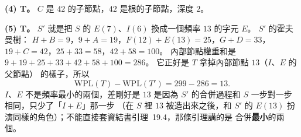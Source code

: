 \begin{pastsoln}
\textbf{(4) T。} $C$ 是 $42$ 的子節點，$42$ 是根的子節點，深度 $2$。

\textbf{(5) T。} $S'$ 就是把 $S$ 的 $E(7)$、$I(6)$ 換成一個頻率 $13$ 的字元 $E$。 $S'$ 的霍夫曼樹：
$H + B = 9$，$9 + A = 19$，$F(12) + E(13) = 25$，$G + D = 33$，$19 + C = 42$，$25 + 33 = 58$，$42 + 58 = 100$。
內部節點權重和是 $9 + 19 + 25 + 33 + 42 + 58 + 100 = 286$。 它正好是 $T$ 拿掉內部節點 $13$（$I$、$E$ 的父節點）
的樣子，所以
\[
\mathrm{WPL}(T) - \mathrm{WPL}(T') = 299 - 286 = 13.
\]
$I$、$E$ 不是頻率最小的兩個，差剛好是 $13$ 是因為 $S'$ 的合併過程和 $S$ 一步對一步相同，只少了「$I + E$」那一步
（在 $S$ 裡 $13$ 被造出來之後，和 $S'$ 的 $E(13)$ 扮演同樣的角色）；不能直接套資結書引理~19.4，那條引理講的是
合併\textbf{最小}的兩個。
\end{pastsoln}
